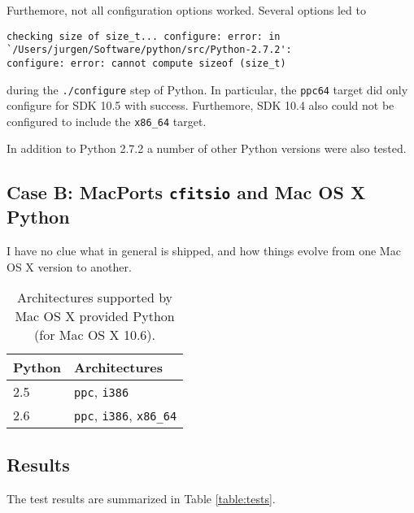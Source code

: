 \documentclass{article}[12pt,a4]
\begin{document}
Furthemore, not all configuration options worked.
Several options led to
\begin{verbatim}
checking size of size_t... configure: error: in `/Users/jurgen/Software/python/src/Python-2.7.2':
configure: error: cannot compute sizeof (size_t)
\end{verbatim}
during the {\tt ./configure} step of Python.
In particular, the {\tt ppc64} target did only configure for SDK 10.5 with success.
Furthemore, SDK 10.4 also could not be configured to include the {\tt x86\_64} target.

In addition to Python 2.7.2 a number of other Python versions were also tested.


\subsection{Case B: MacPorts {\tt cfitsio} and Mac OS X Python}

I have no clue what in general is shipped, and how things evolve from one Mac OS X version to another.

\begin{table}[!h]
  \center
  \begin{tabular}{ll}
  \hline
  Python & Architectures \\
  \hline
  2.5 & {\tt ppc}, {\tt i386} \\
  2.6 & {\tt ppc}, {\tt i386}, {\tt x86\_64} \\
  \hline
  \end{tabular}
  \caption{Architectures supported by Mac OS X provided Python (for Mac OS X 10.6).}
  \label{table:macpython}
\end{table}






\subsection{Results}

The test results are summarized in Table \ref{table:tests}.
\end{document}

